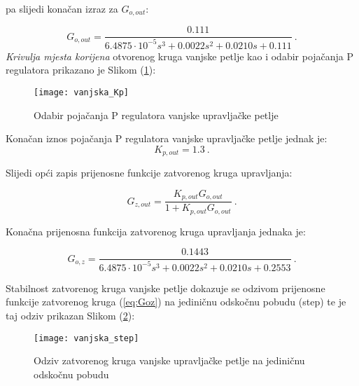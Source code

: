 \documentclass[11pt,a4paper]{article}
\begin{document}
pa slijedi konačan izraz za $G_{o,out}$:

\begin{equation}
G_{o,out} = \frac{0.111}{6.4875\cdot10^{-5}s^{3} + 0.0022s^{2}  + 0.0210s + 0.111} \ .
\label{eq:Ginz}
\end{equation}
\medskip
\textit{Krivulja mjesta korijena} otvorenog kruga vanjske petlje kao i odabir pojačanja P regulatora prikazano je Slikom (\ref{fig:vanjska_Kp}):

\begin{figure}[H]
	\centering
	\texttt{[image: vanjska\_Kp]}
	\caption{Odabir pojačanja P regulatora vanjske upravljačke petlje}
	\label{fig:vanjska_Kp}
\end{figure}

\newpage
Konačan iznos pojačanja P regulatora vanjske upravljačke petlje jednak je:
 \begin{equation}
 \boxed{
 K_{p,out} = 1.3
 } \ .
 \label{eq:Kp_out}
 \end{equation}
 
Slijedi opći zapis prijenosne funkcije zatvorenog kruga upravljanja:

\begin{equation}
G_{z,out} = \frac{K_{p,out}G_{o,out}}{1 + K_{p,out}G_{o,out}} \ .
\label{eq:Goutz}
\end{equation}
 
 Konačna prijenosna funkcija zatvorenog kruga upravljanja jednaka je:
 
 \begin{equation}
 G_{o,z} = \frac{0.1443}{6.4875\cdot10^{-5}s^{3} + 0.0022s^{2}  + 0.0210s + 0.2553} \ .
 \label{eq:Goz}
 \end{equation}

Stabilnost zatvorenog kruga vanjske petlje dokazuje se odzivom prijenosne funkcije zatvorenog kruga (\ref{eq:Goz}) na jediničnu odskočnu pobudu (step) te je taj odziv prikazan Slikom (\ref{fig:step2}):

\begin{figure}[H]
	\centering
	\texttt{[image: vanjska\_step]}
	\caption{Odziv zatvorenog kruga vanjske upravljačke petlje na jediničnu odskočnu pobudu}
	\label{fig:step2}
\end{figure}
\end{document}
